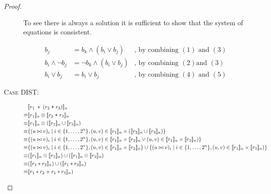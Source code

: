 \begin{proof}
\begin{description}
    To see there is always a solution it is sufficient to show that the system
    of equations is consistent.

    \begin{align}
      b_j &= b_k \wedge (b_i \vee b_j) & \mbox{, by combining $(1)$ and $(3)$} \\
      b_i \wedge \neg b_j &= \neg b_k \wedge (b_i \vee b_j) & \mbox{, by combining $(2)$
        and $(3)$} \\
        b_i \vee b_j &= b_i \vee b_j & \mbox{, by combining $(4)$ and $(5)$}
    \end{align}

  \item[\textsc{Case DIST}:]
    \begin{align*}
             & \llbracket{r_1 \; \ast \; (r_2 \; \texttt{+} \; r_3)}\rrbracket_n \\
      \equiv & \llbracket{r_1}\rrbracket_n \otimes \llbracket{r_2 \; \texttt{+} \; r_3}\rrbracket_n \\
      \equiv & \llbracket{r_1}\rrbracket_n \otimes (\llbracket{r_2}\rrbracket_n \cup \llbracket{r_3}\rrbracket_n) \\
      \equiv & \{ (u \bowtie v)_i \mid i \in \{ 1, \ldots, 2^n \}, (u,v) \in
        \llbracket{r_1}\rrbracket_n \times (\llbracket{r_2}\rrbracket_n \cup \llbracket{r_3}\rrbracket_n) \} \\
      \equiv & \{ (u \bowtie v)_i \mid i \in \{ 1, \ldots, 2^n \}, (u,v) \in
        \llbracket{r_1}\rrbracket_n \times \llbracket{r_2}\rrbracket_n \vee (u,v) \in \llbracket{r_1}\rrbracket_n
        \times \llbracket{r_3}\rrbracket_n) \} \\
      \equiv & \{ (u \bowtie v)_i \mid i \in \{ 1, \ldots, 2^n \}, (u,v) \in
        \llbracket{r_1}\rrbracket_n \times \llbracket{r_2}\rrbracket_n \}
        \cup \{ (u \bowtie v)_i \mid i \in \{ 1, \ldots, 2^n \}, (u,v) \in
        \llbracket{r_1}\rrbracket_n \times \llbracket{r_3}\rrbracket_n) \} \\
      \equiv & (\llbracket{r_1}\rrbracket_n \otimes \llbracket{r_2}\rrbracket_n)
        \cup (\llbracket{r_1}\rrbracket_n \otimes \llbracket{r_3}\rrbracket_n) \\
      \equiv & (\llbracket{r_1 \ast r_2}\rrbracket_n) \cup (\llbracket{r_1 \ast r_3}\rrbracket_n) \\
      \equiv & \llbracket{r_1 \ast r_2 + r_1 \ast r_3}\rrbracket_n) \\
    \end{align*}
\end{description}
\end{proof}
